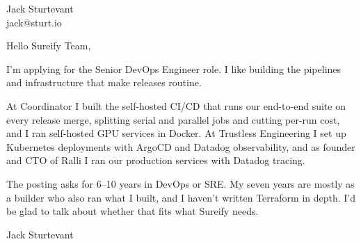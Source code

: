 \documentclass[11pt]{article}
\begin{document}
\raggedright

{\namefont\fontsize{20pt}{24pt}\selectfont Jack Sturtevant}\\[-0.3em]
jack@sturt.io

\vspace{1.2em}

Hello Sureify Team,

I'm applying for the Senior DevOps Engineer role. I like building the pipelines and infrastructure that make releases routine.

At Coordinator I built the self-hosted CI/CD that runs our end-to-end suite on every release merge, splitting serial and parallel jobs and cutting per-run cost, and I ran self-hosted GPU services in Docker. At Trustless Engineering I set up Kubernetes deployments with ArgoCD and Datadog observability, and as founder and CTO of Ralli I ran our production services with Datadog tracing.

The posting asks for 6--10 years in DevOps or SRE. My seven years are mostly as a builder who also ran what I built, and I haven't written Terraform in depth. I'd be glad to talk about whether that fits what Sureify needs.

\vspace{0.6em}
Jack Sturtevant
\end{document}
